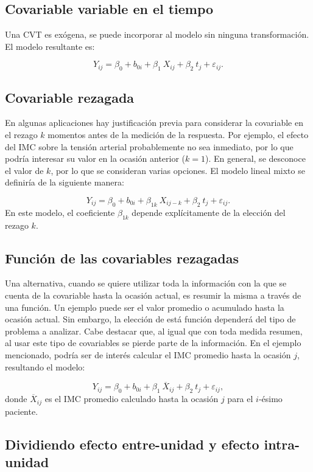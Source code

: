 \documentclass[spanish]{article}
\numberwithin{figure}{subsection}
\numberwithin{equation}{subsection}
\numberwithin{table}{subsection}
\begin{document}
\subsection{Covariable variable en el tiempo}

Una CVT es exógena, se puede incorporar al modelo sin ninguna transformación. El
modelo resultante es:

\[ Y_{ij} = \beta_0 + b_{0i} + \beta_1\ X_{ij} + \beta_2\ t_j + \varepsilon_{ij}. \]

\subsection{Covariable rezagada}

En algunas aplicaciones hay justificación previa para considerar la covariable
en el rezago $k$ momentos antes de la medición de la respuesta. Por ejemplo, el
efecto del IMC sobre la tensión arterial probablemente no sea inmediato, por lo
que podría interesar su valor en la ocasión anterior ($k=1$). En general, se
desconoce el valor de $k$, por lo que se consideran varias opciones. El modelo
lineal mixto se definiría de la siguiente manera:

\[ Y_{ij} = \beta_0 + b_{0i} + \beta_{1k}\ X_{ij-k} + \beta_2\ t_j + \varepsilon_{ij}. \]
En este modelo, el coeficiente $\beta_{1k}$ depende explícitamente de la
elección del rezago $k$.

\subsection{Función de las covariables rezagadas}

Una alternativa, cuando se quiere utilizar toda la información con la que se
cuenta de la covariable hasta la ocasión actual, es resumir la misma a través de
una función. Un ejemplo puede ser el valor promedio o acumulado hasta la ocasión
actual. Sin embargo, la elección de está función dependerá del tipo de problema
a analizar. Cabe destacar que, al igual que con toda medida resumen, al usar
este tipo de covariables se pierde parte de la información. En el ejemplo
mencionado, podría ser de interés calcular el IMC promedio hasta la ocasión $j$,
resultando el modelo:

\[ Y_{ij} = \beta_0 + b_{0i} + \beta_1\ \overline{X}_{ij} + \beta_2\ t_j + \varepsilon_{ij}, \]
donde $\overline{X}_{ij}$ es el IMC promedio calculado hasta la ocasión $j$ para
el $i$-ésimo paciente.

\subsection{Dividiendo efecto entre-unidad y efecto intra-unidad}
\label{Dividiendo efecto entre-unidad y efecto intra-unidad}
\end{document}

